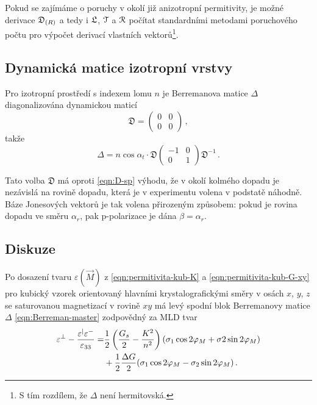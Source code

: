 Pokud se zajímáme o poruchy v okolí již anizotropní permitivity, je možné derivace $\mathfrak{D}_{(R)}$ a tedy i $\mathfrak{L}$, $\mathcal{T}$ a $\mathcal{R}$ počítat standardními metodami poruchového počtu pro výpočet derivací vlastních vektorů\footnote{S tím rozdílem, že $\Delta$ není hermitovská.}.

\subsection*{Dynamická matice izotropní vrstvy}

Pro izotropní prostředí s indexem lomu $n$ je Berremanova matice $\Delta$ diagonalizována dynamickou maticí
\begin{equation}
    \mathfrak{D} = \begin{pmatrix} 0&0\\0&0 \end{pmatrix} \,,
\end{equation}
takže
\begin{equation}
    \Delta = n\cos\alpha_t \cdot\mathfrak{D} \begin{pmatrix} -1&0\\0&1 \end{pmatrix} \mathfrak{D}^{-1} \,.
\end{equation}

Tato volba $\mathfrak{D}$ má oproti \eqref{eqn:D-sp} výhodu, že v okolí kolmého dopadu je nezávislá na rovině dopadu, která je v experimentu volena v podstatě náhodně.
Báze Jonesových vektorů je tak volena přirozeným způsobem: pokud je rovina dopadu ve směru $\alpha_r$, pak p-polarizace je dána $\beta=\alpha_r$.



\subsection*{Diskuze}

Po dosazení tvaru $\varepsilon(\vec{M})$ z \eqref{eqn:permitivita-kub-K} a \eqref{eqn:permitivita-kub-G-xy} pro kubický vzorek orientovaný hlavními krystalografickými směry v osách $x$, $y$, $z$ se saturovanou magnetizací v rovině $xy$ má levý spodní blok Berremanovy matice $\Delta$ \eqref{eqn:Berreman-master} zodpovědný za MLD tvar
\begin{align}
    \varepsilon^\perp - \frac{\varepsilon^\vert\varepsilon^-}{\varepsilon_{33}} =& \frac{1}{2}\left( \frac{G_s}{2}-\frac{K^2}{n^2} \right) (\sigma_1\cos2\varphi_M + \sigma2\sin2\varphi_M) \\
                                                                                &+ \frac{1}{2}\frac{\Delta G}{2}(\sigma_1\cos2\varphi_M - \sigma_2 \sin2\varphi_M) \,.
\end{align}


